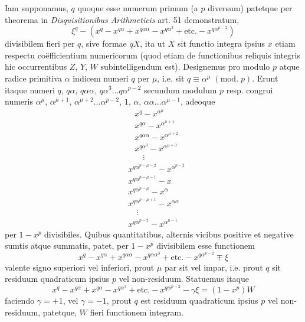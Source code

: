 \documentclass[twoside,12pt, showframe]{memoir}
\renewcommand{\pmod}[1]{\;(\textrm{mod.}\;#1)}
\begin{document}
Iam supponamus, \(q\) quoque esse numerum primum (a \(p\) diversum) patetque per theorema in \textit{Disquisitionibus Arithmeticis} art. 51 demonstratum,
\[\xi^{q}-(x^{q}-x^{q \alpha}+x^{q \alpha \alpha}-x^{q \alpha^{3}}+\text{etc.}-x^{q \alpha^{p-2}})\]
divisibilem fieri per \(q\), sive formae \(q X\), ita ut \(X\) sit functio integra ipsius \(x\) etiam respectu coëfficientium numericorum (quod etiam de functionibus reliquis integris hic occurrentibus \(Z\), \(Y\), \(W\) subintelligendum est). Designemus pro modulo \(p\) atque radice primitiva \(\alpha\) indicem numeri \(q\) per \(\mu\), i.e. sit \(q \equiv \alpha^{\mu}\pmod{p}\). Erunt itaque numeri \(q\), \(q \alpha\), \(q \alpha \alpha\), \(q \alpha^{3} \ldots q \alpha^{p-2}\) secundum modulum \(p\) resp. congrui numeris \(\alpha^{\mu}\), \(\alpha^{\mu+1}\), \(\alpha^{\mu+2} \ldots \alpha^{p-2}\), \(1\), \(\alpha\), \(\alpha \alpha \ldots \alpha^{\mu-1}\), adeoque
\[\begin{aligned}
&x^{q}-x^{\alpha^{\mu}} \\
&x^{q \alpha}-x^{\alpha^{\mu+1}} \\
&x^{q \alpha \alpha}-x^{\alpha^{\mu+2}} \\
&x^{q \alpha^{3}}-x^{\alpha^{\mu+3}}\\
&\quad \vdots \end{aligned}\]\clearpage\noindent%
\[\begin{aligned}
&x^{q \alpha^{p-\mu-2}}-x^{\alpha^{p-2}}\\
&x^{q \alpha^{p-\mu-1}}-x\\
&x^{q \alpha^{p-\mu}}-x^{\alpha}\\
&x^{q \alpha^{p-\mu+1}}-x^{\alpha \alpha}\\
&\quad \vdots\\
&x^{q\alpha^{p-2}}-x^{\alpha^{\mu-1}}
\end{aligned}\]
per \(1-x^{p}\) divisibiles. Quibus quantitatibus, alternis vicibus positive et negative sumtis atque summatis, patet, per \(1-x^{p}\) divisibilem esse functionem
\[x^{q}-x^{q \alpha}+x^{q \alpha \alpha}-x^{q \alpha \alpha^{3}}+\text{etc.}-x^{q \alpha^{p-2}} \mp \xi\]
valente signo superiori vel inferiori, prout \(\mu\) par sit vel impar, i.e. prout \(q\) sit residuum quadraticum ipsius \(p\) vel non-residuum. Statuemus itaque
\[x^{q}-x^{q \alpha}+x^{q \alpha}-x^{q \alpha^{3}}+\text{etc.}-x^{q \alpha^{p-2}}-\gamma \xi=(1-x^{p}) W\]
faciendo \(\gamma=+1\), vel \(\gamma=-1\), prout \(q\) est residuum quadraticum ipsius \(p\) vel non-residuum, patetque, \(W\) fieri functionem integram.
\end{document}
